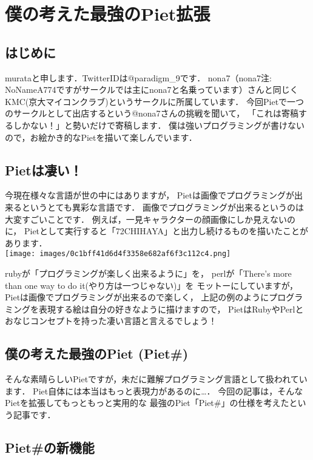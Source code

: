 \chapter{僕の考えた最強のPiet拡張}

\section{はじめに}

murataと申します．TwitterIDは@paradigm\_9です．
nona7（nona7注: NoNameA774ですがサークルでは主にnona7と名乗っています）さんと同じくKMC(京大マイコンクラブ)というサークルに所属しています．
今回Pietで一つのサークルとして出店するという@nona7さんの挑戦を聞いて，
「これは寄稿するしかない！」と勢いだけで寄稿します．
僕は強いプログラミングが書けないので，お絵かき的なPietを描いて楽しんでいます．

\section{Pietは凄い！}

今現在様々な言語が世の中にはありますが，
Pietは画像でプログラミングが出来るというとても異彩な言語です．
画像でプログラミングが出来るというのは大変すごいことです．
例えば，一見キャラクターの顔画像にしか見えないのに，
Pietとして実行すると「72CHIHAYA」と出力し続けるものを描いたことがあります．\\\texttt{[image: images/0c1bff41d6d4f3358e682af6f3c112c4.png]}

rubyが「プログラミングが楽しく出来るように」を， perlが「There's more
than one way to do it(やり方は一つじゃない)」を モットーにしていますが，
Pietは画像でプログラミングが出来るので楽しく，
上記の例のようにプログラミングを表現する絵は自分の好きなように描けますので，
PietはRubyやPerlとおなじコンセプトを持った凄い言語と言えるでしょう！

\section{僕の考えた最強のPiet (Piet\#)}

そんな素晴らしいPietですが，未だに難解プログラミング言語として扱われています．
Piet自体には本当はもっと表現力があるのに\ldots{}．
今回の記事は，そんなPietを拡張してもっともっと実用的な
最強のPiet「Piet\#」の仕様を考えたという記事です．

\section{Piet\#の新機能}

